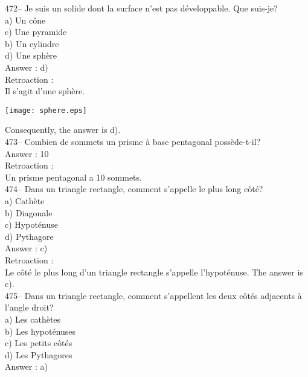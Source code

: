 ﻿\documentclass[letterpaper, 12pt]{article}
\begin{document}
472-- Je suis un solide dont la surface n'est pas d\'eveloppable.  Que
suis-je?\\
a) Un c\^one\\
c) Une pyramide\\
b) Un cylindre\\
d) Une sph\`ere\\

Answer : d)\\

Retroaction : \\
Il s'agit d'une sph\`ere.
    \begin{center}
    \texttt{[image: sphere.eps]}
    \end{center}

Consequently, the answer is d).\\

473-- Combien de sommets un prisme \`a base pentagonal poss\`ede-t-il?\\

Answer : 10\\

Retroaction : \\
Un prisme pentagonal a 10 sommets. \\


474-- Dans un triangle rectangle, comment s'appelle le plus long c\^ot\'e?\\
a) Cath\`ete\\
b) Diagonale\\
c) Hypot\'enuse\\
d) Pythagore\\

Answer :  c)\\

Retroaction : \\
Le c\^ot\'e le plus long d'un triangle rectangle s'appelle l'hypot\'enuse.
The answer is c).\\


475-- Dans un triangle rectangle, comment s'appellent les deux c\^ot\'es
adjacents \`a l'angle droit?\\
a) Les cath\`etes\\
b) Les hypot\'enuses\\
c) Les petits c\^ot\'es\\
d) Les Pythagores\\

Answer :  a)\\
\end{document}
